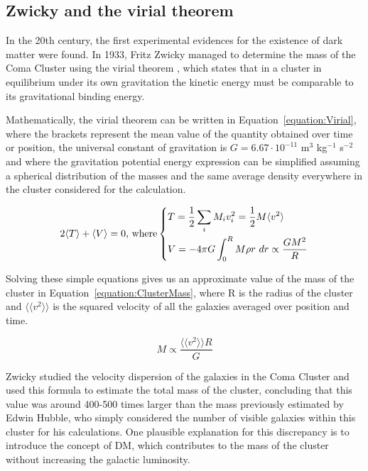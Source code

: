 \documentclass[a4paper, 10pt, openright]{report}
\begin{document}
\subsection{Zwicky and the virial theorem}

In the 20th century, the first experimental evidences for the existence of dark matter were found. In 1933, Fritz Zwicky managed to determine the mass of the Coma Cluster using the virial theorem \cite{Zwicky}, which states that in a cluster in equilibrium under its own gravitation the kinetic energy must be comparable to its gravitational binding energy. 

Mathematically, the virial theorem can be written in Equation~\ref{equation:Virial}, where the brackets represent the mean value of the quantity obtained over time or position, the universal constant of gravitation is $G = 6.67 \cdot 10^{-11}$ m$^3$ kg$^{-1}$ s$^{-2}$ and where the gravitation potential energy expression can be simplified assuming a spherical distribution of the masses and the same average density everywhere in the cluster considered for the calculation.

\begin{equation} \label{equation:Virial}
2 \langle T \rangle + \langle V \rangle = 0 \text{, where}
\begin{dcases}
T = \frac{1}{2} \sum_i M_i v_i^2 = \frac{1}{2} M \langle v^2 \rangle\\
V = -4 \pi G \int_0^R M \rho r \text{ } dr \propto \frac{G M^2}{R}
\end{dcases}
\end{equation}

Solving these simple equations gives us an approximate value of the mass of the cluster in Equation~\ref{equation:ClusterMass}, where R is the radius of the cluster and $\langle \langle v^2 \rangle \rangle$ is the squared velocity of all the galaxies averaged over position and time.

\begin{equation} \label{equation:ClusterMass}
M \propto \frac{\langle \langle v^2 \rangle \rangle R}{G}
\end{equation} 

Zwicky studied the velocity dispersion of the galaxies in the Coma Cluster and used this formula to estimate the total mass of the cluster, concluding that this value was around 400-500 times larger than the mass previously estimated by Edwin Hubble, who simply considered the number of visible galaxies within this cluster for his calculations. One plausible explanation for this discrepancy is to introduce the concept of \ac{DM}, which contributes to the mass of the cluster without increasing the galactic luminosity.
\end{document}

